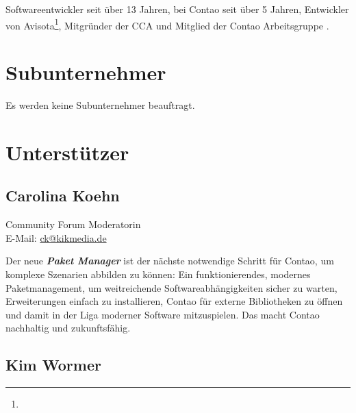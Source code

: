 \documentclass[
paper=a4,
draft=false,%
fontsize=10pt%
]{scrartcl}
\newcommand{\packageManager}{\textbf{\textit{Paket Manager}}}
\begin{document}
Softwareentwickler seit über 13 Jahren, bei Contao seit über 5 Jahren, Entwickler von Avisota\footnote{}, Mitgründer der CCA und Mitglied der Contao Arbeitsgruppe .

%
%

\section{Subunternehmer}
\label{sec:contractor}

Es werden keine Subunternehmer beauftragt.

\newpage

%
%

\section{Unterstützer}
\label{sec:backers}

\subsection*{Carolina  Koehn}

Community Forum Moderatorin \\
E-Mail: \href{mailto:ck@kikmedia.de}{ck@kikmedia.de}

\begin{emquote}{}
Der neue \packageManager{} ist der nächste notwendige Schritt für Contao, um komplexe Szenarien abbilden zu können:
Ein funktionierendes, modernes  Paketmanagement, um weitreichende Softwareabhängigkeiten sicher zu warten, Erweiterungen einfach zu installieren, Contao für externe Bibliotheken zu öffnen und damit in der Liga moderner Software mitzuspielen. Das macht Contao nachhaltig und zukunftsfähig.
\end{emquote}

\subsection*{Kim  Wormer}
\end{document}
